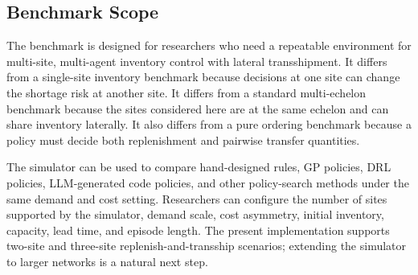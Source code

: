 \documentclass[journal]{IEEEtran}
\begin{document}
\subsection{Benchmark Scope}

The benchmark is designed for researchers who need a repeatable environment for multi-site, multi-agent inventory control with lateral transshipment. It differs from a single-site inventory benchmark because decisions at one site can change the shortage risk at another site. It differs from a standard multi-echelon benchmark because the sites considered here are at the same echelon and can share inventory laterally. It also differs from a pure ordering benchmark because a policy must decide both replenishment and pairwise transfer quantities.

The simulator can be used to compare hand-designed rules, GP policies, DRL policies, LLM-generated code policies, and other policy-search methods under the same demand and cost setting. Researchers can configure the number of sites supported by the simulator, demand scale, cost asymmetry, initial inventory, capacity, lead time, and episode length. The present implementation supports two-site and three-site replenish-and-transship scenarios; extending the simulator to larger networks is a natural next step.
\end{document}
